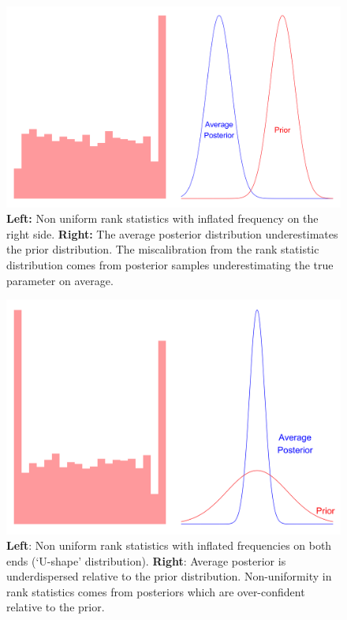 \documentclass[12pt, a4paper]{article}
\begin{document}
            \begin{figure}[H]
                \centering
                \includegraphics[scale=0.07]{methodology/rhs.png}
                \caption{\textbf{Left:} Non uniform rank statistics with inflated frequency on the right side. \textbf{Right:} The average posterior distribution underestimates the prior distribution. The miscalibration from the rank statistic distribution comes from posterior samples underestimating the true parameter on average.}
                \label{fig:underestimation}
            \end{figure}        

            \begin{figure}[H]
                \centering
                \includegraphics[scale=0.07]{methodology/underdispersed.png}
                \caption{\textbf{Left}: Non uniform rank statistics with inflated frequencies on both ends (`U-shape' distribution). \textbf{Right}: Average posterior is underdispersed relative to the prior distribution. Non-uniformity in rank statistics comes from posteriors which are over-confident relative to the prior.}
                \label{fig:underdispersed}
            \end{figure}
\end{document}
